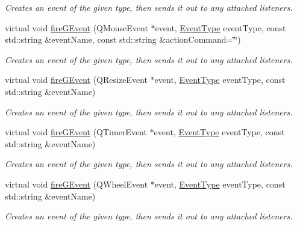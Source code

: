 \begin{DoxyCompactItemize}
\begin{DoxyCompactList}\small\item\em Creates an event of the given type, then sends it out to any attached listeners. \end{DoxyCompactList}\item 
virtual void \mbox{\hyperlink{classsgl_1_1GObservable_a119318675d2165bdf7dd853aaf881d4b}{fire\+G\+Event}} (Q\+Mouse\+Event $\ast$event, \mbox{\hyperlink{namespacesgl_a2628ea8d12e8b2563c32f05dc7fff6fa}{Event\+Type}} event\+Type, const std\+::string \&event\+Name, const std\+::string \&action\+Command=\char`\"{}\char`\"{})
\begin{DoxyCompactList}\small\item\em Creates an event of the given type, then sends it out to any attached listeners. \end{DoxyCompactList}\item 
virtual void \mbox{\hyperlink{classsgl_1_1GObservable_a63fd9034e1e1633c1c38eb342bfd34e9}{fire\+G\+Event}} (Q\+Resize\+Event $\ast$event, \mbox{\hyperlink{namespacesgl_a2628ea8d12e8b2563c32f05dc7fff6fa}{Event\+Type}} event\+Type, const std\+::string \&event\+Name)
\begin{DoxyCompactList}\small\item\em Creates an event of the given type, then sends it out to any attached listeners. \end{DoxyCompactList}\item 
virtual void \mbox{\hyperlink{classsgl_1_1GObservable_a741345310d9b7c5170a6cbc410c44ac4}{fire\+G\+Event}} (Q\+Timer\+Event $\ast$event, \mbox{\hyperlink{namespacesgl_a2628ea8d12e8b2563c32f05dc7fff6fa}{Event\+Type}} event\+Type, const std\+::string \&event\+Name)
\begin{DoxyCompactList}\small\item\em Creates an event of the given type, then sends it out to any attached listeners. \end{DoxyCompactList}\item 
virtual void \mbox{\hyperlink{classsgl_1_1GObservable_a93bf338968a0338761b8e4dc62f582e9}{fire\+G\+Event}} (Q\+Wheel\+Event $\ast$event, \mbox{\hyperlink{namespacesgl_a2628ea8d12e8b2563c32f05dc7fff6fa}{Event\+Type}} event\+Type, const std\+::string \&event\+Name)
\begin{DoxyCompactList}\small\item\em Creates an event of the given type, then sends it out to any attached listeners. \end{DoxyCompactList}\item 

\end{DoxyCompactItemize}
